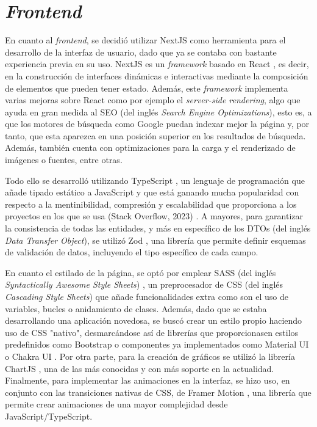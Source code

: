 \section{\textit{Frontend}}
\label{sec:herramientas_frontend}

En cuanto al \textit{frontend}, se decidió utilizar NextJS \cite{nextjs} como herramienta para el desarrollo de la interfaz de usuario, dado que ya
se contaba con bastante experiencia previa en su uso. NextJS es un \textit{framework} basado en React \cite{react}, es decir, en la construcción de interfaces dinámicas e interactivas mediante la composición
de elementos que pueden tener estado. Además, este \textit{framework} implementa varias mejoras sobre React como por ejemplo el \textit{server-side rendering}, algo que ayuda en gran medida
al SEO (del inglés \textit{Search Engine Optimizations}), esto es, a que los motores de búsqueda como Google puedan indexar mejor la página y, por tanto, que esta aparezca en una posición superior en los resultados de búsqueda.
Además, también cuenta con optimizaciones para la carga y el renderizado de imágenes o fuentes, entre otras.

\bigskip
Todo ello se desarrolló utilizando TypeScript \cite{typescript}, un lenguaje de programación que añade tipado estático a JavaScript
y que está ganando mucha popularidad con respecto a la mentinibilidad, compresión y escalabilidad que proporciona a los proyectos en los que se usa (Stack Overflow, 2023) \cite{stackoverflow2023}.
A mayores, para garantizar la consistencia de todas las entidades, y más en específico de los DTOs (del inglés \textit{Data Transfer Object}), se utilizó Zod \cite{zod}, una librería que permite
definir esquemas de validación de datos, incluyendo el tipo específico de cada campo.

\bigskip
En cuanto el estilado de la página, se optó por emplear SASS (del inglés \textit{Syntactically Awesome Style Sheets}) \cite{sass}, un preprocesador de CSS (del inglés \textit{Cascading Style Sheets}) que añade
funcionalidades extra como son el uso de variables, bucles o anidamiento de clases. Además, dado que se estaba desarrollando
una aplicación novedosa, se buscó crear un estilo propio haciendo uso de CSS "nativo", desmarcándose así de librerías que proporcionasen estilos predefinidos como Bootstrap \cite{bootstrap} o componentes ya implementados
como Material UI \cite{materialui} o Chakra UI \cite{chakraui}. Por otra parte, para la creación de gráficos se utilizó la librería ChartJS \cite{chartjs}, una de las más conocidas
y con más soporte en la actualidad. Finalmente, para implementar las animaciones en la interfaz, se hizo uso, en conjunto con las transiciones nativas
de CSS, de Framer Motion \cite{framermotion}, una librería que permite crear animaciones de una mayor complejidad desde JavaScript/TypeScript. 

